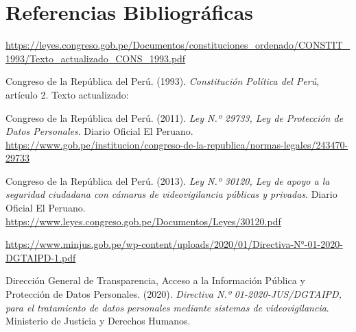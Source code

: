 \section{Referencias Bibliográficas}
\label{sec:referencias}

\newcommand{\refapa}[1]{\par\noindent\hangindent=1.25cm\hangafter=1 #1\par\vspace{0.35cm}}

\urldef{\urlConstitucion}\url{https://leyes.congreso.gob.pe/Documentos/constituciones_ordenado/CONSTIT_1993/Texto_actualizado_CONS_1993.pdf}

\refapa{Congreso de la República del Perú. (1993). \emph{Constitución Política del Perú},
artículo 2. Texto actualizado: \urlConstitucion}

\refapa{Congreso de la República del Perú. (2011). \emph{Ley N.º 29733, Ley de Protección
de Datos Personales}. Diario Oficial El Peruano.
\url{https://www.gob.pe/institucion/congreso-de-la-republica/normas-legales/243470-29733}}

\refapa{Congreso de la República del Perú. (2013). \emph{Ley N.º 30120, Ley de apoyo a la
seguridad ciudadana con cámaras de videovigilancia públicas y privadas}. Diario Oficial El
Peruano. \url{https://www.leyes.congreso.gob.pe/Documentos/Leyes/30120.pdf}}

\urldef{\urlDirectiva}\url{https://www.minjus.gob.pe/wp-content/uploads/2020/01/Directiva-N°-01-2020-DGTAIPD-1.pdf}

\refapa{Dirección General de Transparencia, Acceso a la Información Pública y Protección
de Datos Personales. (2020). \emph{Directiva N.º 01-2020-JUS/DGTAIPD, para el tratamiento
de datos personales mediante sistemas de videovigilancia}. Ministerio de Justicia y Derechos
Humanos. \urlDirectiva}


